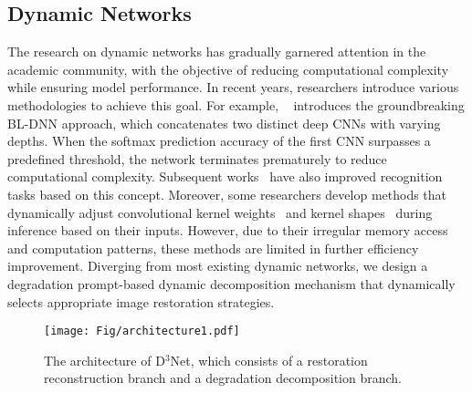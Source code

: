 \subsection{Dynamic Networks}
The research on dynamic networks has gradually garnered attention in the academic community, with the objective of reducing computational complexity while ensuring model performance. In recent years, researchers introduce various methodologies to achieve this goal. For example, ~\cite{Park2015BiglittleDN} introduces the groundbreaking BL-DNN approach, which concatenates two distinct deep CNNs with varying depths. When the softmax prediction accuracy of the first CNN surpasses a predefined threshold, the network terminates prematurely to reduce computational complexity. Subsequent works~\cite{Zhu_Han_Wu_Zhang_Nie_Lan_Wang_2021, Li_Wang_Wang_Liang_Li_Chang_2021, Wu_Nagarajan_Kumar_Rennie_Davis_Grauman_Feris_2018, Yu_Wang_Dong_Tang_Loy_2021} have also improved recognition tasks based on this concept.
Moreover, some researchers develop methods that dynamically adjust convolutional kernel weights~\cite{Yang2019CondConvCP,Chen2019DynamicCA,Harley2017SegmentationAwareCN,Su2019PixelAdaptiveCN} and kernel shapes~\cite{Dai2017DeformableCN,Zhu2018DeformableCV,Gao2019DeformableKA} during inference based on their inputs. However, due to their irregular memory access and computation patterns, these methods are limited in further efficiency improvement. Diverging from most existing dynamic networks, we design a degradation prompt-based dynamic decomposition mechanism that dynamically selects appropriate image restoration strategies.
\begin{figure*}[t] 
\centering 
\texttt{[image: Fig/architecture1.pdf]} 
\caption{The architecture of D$^3$Net, which consists of a restoration reconstruction branch and a degradation decomposition branch.} 
\label{fig:2} 
\end{figure*}